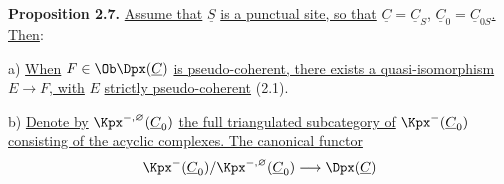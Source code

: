 \textbf{Proposition 2.7.} \uline{Assume that} \(\underline{S}\) \uline{is a punctual site, so that} \(\underline{C}=\underline{C}_S\)\uline{,} \(\underline{C}_0=\underline{C}_{0S}\)\uline{. Then}:

a) \uline{When} \(F\in\Ob\Dpx(\underline{C})\) \uline{is pseudo-coherent, there exists a quasi-isomorphism} \(E\longrightarrow F\)\uline{, with} \(E\) \uline{strictly pseudo-coherent} (2.1).

b) \uline{Denote by} \(\Kpx^{-,\varnothing}(\underline{C}_0)\) \uline{the full triangulated subcategory of} \(\Kpx^-(\underline{C}_0)\) \uline{consisting of the acyclic complexes. The canonical functor}
\[
  \Kpx^-(\underline{C}_0)/\Kpx^{-,\varnothing}(\underline{C}_0)
  \longrightarrow \Dpx(\underline{C})
\]
